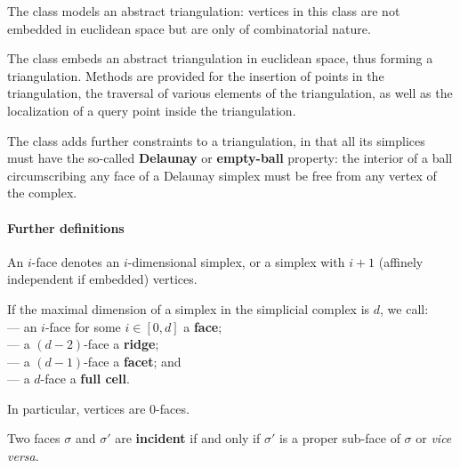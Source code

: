 {{The class  models an abstract triangulation: vertices in this
class are not embedded in euclidean space but are only of combinatorial
nature.

The class  embeds an abstract
triangulation in euclidean space, thus forming a triangulation. Methods are
provided for the insertion %
of points in the triangulation, the
traversal of various elements of the triangulation, as well as the localization of a
query point inside the triangulation.

The class  adds further
constraints to a triangulation, in that all its simplices must have the
so-called \textbf{Delaunay} or \textbf{empty-ball} property: the interior of
a ball circumscribing any face of a Delaunay simplex must be free from any
vertex of the complex.



\paragraph{Further definitions}

An $i$-face denotes an $i$-dimensional simplex, or a simplex
with $i+1$ (affinely independent if embedded) vertices.

If the maximal dimension of a simplex in the simplicial complex is
$d$, we call:\\
--- an $i$-face for some $i\in[0,d]$ a  \textbf{face};\\
--- a $(d-2)$-face a \textbf{ridge};\\
--- a $(d-1)$-face a \textbf{facet}; and\\
--- a $d$-face  a \textbf{full cell}.

In particular, vertices are $0$-faces.

Two faces $\sigma$ and $\sigma'$ are \textbf{incident} if and only if
$\sigma'$ is a proper sub-face of $\sigma$ or \emph{vice versa}.

}}
